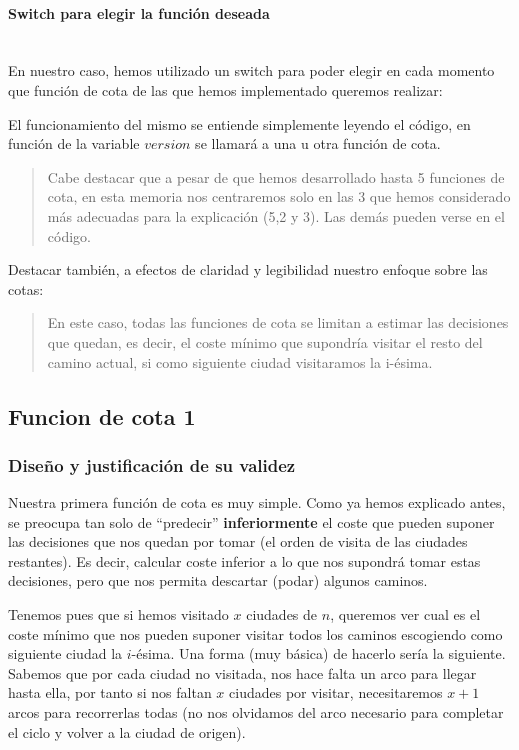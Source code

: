 \documentclass{article}
\newcommand{\myparagraph}[1]{\paragraph{#1}\mbox{}\\}
\begin{document}
\myparagraph{Switch para elegir la función deseada}
En nuestro caso, hemos utilizado un switch para poder elegir en cada momento que función de cota de las que hemos implementado queremos realizar:

El funcionamiento del mismo se entiende simplemente leyendo el código, en función de la variable $version$ se llamará a una u otra función de cota.
\begin{quote}
    Cabe destacar que a pesar de que hemos desarrollado hasta 5 funciones de cota, en esta memoria nos centraremos solo en las 3 que hemos considerado más adecuadas para la explicación (5,2 y 3). Las demás pueden verse en el código.
\end{quote}


Destacar también, a  efectos de claridad y legibilidad nuestro enfoque sobre las cotas:\begin{quote}
    
En este caso, todas las funciones de cota se limitan a estimar las decisiones que quedan, es decir, el coste mínimo que supondría visitar el resto del camino actual, si como siguiente ciudad visitaramos la i-ésima.
\end{quote}

 
\subsection{Funcion de cota 1}

\subsubsection{Diseño y justificación de su validez}

Nuestra primera función de cota es muy simple. Como ya hemos explicado antes,
se preocupa tan solo de ``predecir'' \textbf{inferiormente} el coste que pueden suponer las decisiones que nos quedan por tomar (el orden de visita de las ciudades restantes). Es decir, calcular coste inferior a lo que nos supondrá tomar estas decisiones, pero que nos permita descartar (podar) algunos caminos.

Tenemos pues que si hemos visitado $x$ ciudades de $n$, queremos ver cual es el coste mínimo que nos pueden suponer visitar todos los caminos escogiendo como siguiente ciudad la $i$-ésima. Una forma (muy básica) de hacerlo sería
la siguiente. Sabemos que por cada ciudad no visitada, nos hace falta un arco para llegar hasta ella, por tanto si nos faltan $x$ ciudades por visitar, necesitaremos $x+1$ arcos para recorrerlas todas (no nos olvidamos del arco necesario para completar el ciclo y volver a la ciudad de origen).
\end{document}
